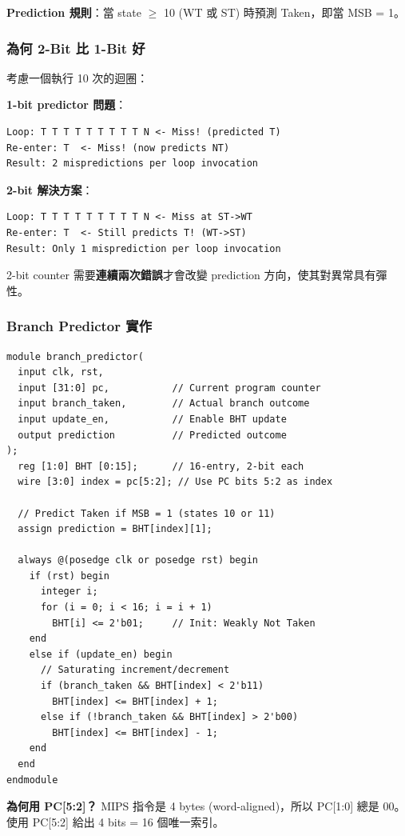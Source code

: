 \documentclass[journal]{IEEEtran}
\begin{document}
\textbf{Prediction 規則}：當 state $\geq$ 10 (WT 或 ST) 時預測 Taken，即當 MSB = 1。

\subsubsection{為何 2-Bit 比 1-Bit 好}
考慮一個執行 10 次的迴圈：

\textbf{1-bit predictor 問題}：
\begin{lstlisting}
Loop: T T T T T T T T T N <- Miss! (predicted T)
Re-enter: T  <- Miss! (now predicts NT)
Result: 2 mispredictions per loop invocation
\end{lstlisting}

\textbf{2-bit 解決方案}：
\begin{lstlisting}
Loop: T T T T T T T T T N <- Miss at ST->WT
Re-enter: T  <- Still predicts T! (WT->ST)
Result: Only 1 misprediction per loop invocation
\end{lstlisting}

2-bit counter 需要\textbf{連續兩次錯誤}才會改變 prediction 方向，使其對異常具有彈性。

\subsubsection{Branch Predictor 實作}
\begin{lstlisting}
module branch_predictor(
  input clk, rst,
  input [31:0] pc,           // Current program counter
  input branch_taken,        // Actual branch outcome
  input update_en,           // Enable BHT update
  output prediction          // Predicted outcome
);
  reg [1:0] BHT [0:15];      // 16-entry, 2-bit each
  wire [3:0] index = pc[5:2]; // Use PC bits 5:2 as index
  
  // Predict Taken if MSB = 1 (states 10 or 11)
  assign prediction = BHT[index][1];
  
  always @(posedge clk or posedge rst) begin
    if (rst) begin
      integer i;
      for (i = 0; i < 16; i = i + 1)
        BHT[i] <= 2'b01;     // Init: Weakly Not Taken
    end
    else if (update_en) begin
      // Saturating increment/decrement
      if (branch_taken && BHT[index] < 2'b11)
        BHT[index] <= BHT[index] + 1;
      else if (!branch_taken && BHT[index] > 2'b00)
        BHT[index] <= BHT[index] - 1;
    end
  end
endmodule
\end{lstlisting}

\textbf{為何用 PC[5:2]？} MIPS 指令是 4 bytes (word-aligned)，所以 PC[1:0] 總是 00。使用 PC[5:2] 給出 4 bits = 16 個唯一索引。
\end{document}
